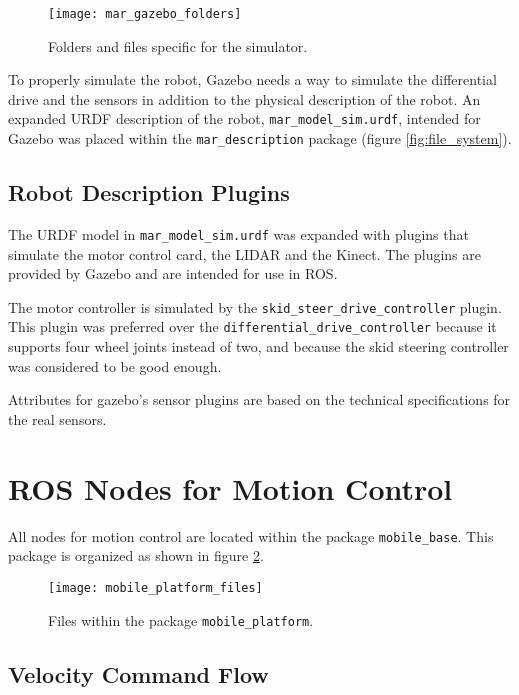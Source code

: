 \begin{figure}[h]
	\centering
	\texttt{[image: mar\_gazebo\_folders]}
	\caption{Folders and files specific for the simulator.}
	\label{fig:mar_2dnav}
\end{figure}

To properly simulate the robot, Gazebo needs a way to simulate the differential drive and the sensors in addition to the physical description of the robot. An expanded \ac{URDF} description of the robot, \texttt{mar\_model\_sim.urdf}, intended for Gazebo was placed within the \texttt{mar\_description} package (figure \ref{fig:file_system}). 

\subsection{Robot Description Plugins}

The \ac{URDF} model in \texttt{mar\_model\_sim.urdf} was expanded with plugins that simulate the motor control card, the \ac{LIDAR} and the Kinect. The plugins are provided by Gazebo and are intended for use in \ac{ROS}. 

The motor controller is simulated by the \texttt{skid\_steer\_drive\_controller} plugin. This plugin was preferred over the \texttt{differential\_drive\_controller} because it supports four wheel joints instead of two, and because the skid steering controller was considered to be good enough. 

Attributes for gazebo's sensor plugins are based on the technical specifications\cite{hokuyo_spec} for the real sensors. 

\section{ROS Nodes for Motion Control}
\label{sec:control}
All nodes for motion control are located within the package \texttt{mobile\_base}. This package is organized as shown in figure \ref{fig:mobile_platform_files}.

\begin{figure}[h]
	\centering
	\texttt{[image: mobile\_platform\_files]}
	\caption{Files within the package \texttt{mobile\_platform}.}
	\label{fig:mobile_platform_files}
\end{figure}

\subsection{Velocity Command Flow}

